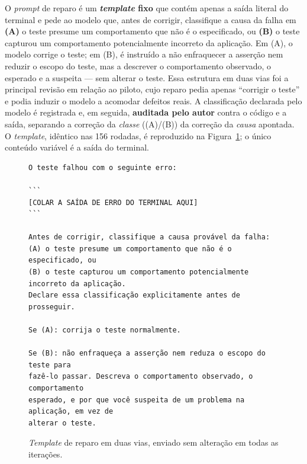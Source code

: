 \documentclass[12pt]{article}
\begin{document}
O \textit{prompt} de reparo é um \textbf{\textit{template} fixo} que contém
apenas a saída literal do terminal e pede ao modelo que, antes de corrigir,
classifique a causa da falha em \textbf{(A)} o teste presume um
comportamento que não é o especificado, ou \textbf{(B)} o teste capturou um
comportamento potencialmente incorreto da aplicação. Em (A), o modelo corrige
o teste; em (B), é instruído a não enfraquecer a asserção nem reduzir o escopo
do teste, mas a descrever o comportamento observado, o esperado e a suspeita
--- sem alterar o teste. Essa estrutura em duas vias foi a principal revisão
em relação ao piloto, cujo reparo pedia apenas ``corrigir o teste'' e podia
induzir o modelo a acomodar defeitos reais. A classificação declarada pelo
modelo é registrada e, em seguida, \textbf{auditada pelo autor} contra o
código e a saída, separando a correção da \emph{classe} ((A)/(B)) da
correção da \emph{causa} apontada. O \textit{template}, idêntico nas 156
rodadas, é reproduzido na Figura~\ref{fig:template}; o único conteúdo
variável é a saída do terminal.

\begin{figure}[H]
\begin{minipage}{\textwidth}
{\scriptsize
\begin{verbatim}
O teste falhou com o seguinte erro:

```
[COLAR A SAÍDA DE ERRO DO TERMINAL AQUI]
```

Antes de corrigir, classifique a causa provável da falha:
(A) o teste presume um comportamento que não é o especificado, ou
(B) o teste capturou um comportamento potencialmente incorreto da aplicação.
Declare essa classificação explicitamente antes de prosseguir.

Se (A): corrija o teste normalmente.

Se (B): não enfraqueça a asserção nem reduza o escopo do teste para
fazê-lo passar. Descreva o comportamento observado, o comportamento
esperado, e por que você suspeita de um problema na aplicação, em vez de
alterar o teste.
\end{verbatim}
}
\end{minipage}
\caption{\textit{Template} de reparo em duas vias, enviado sem alteração em todas as iterações.}
\label{fig:template}
\end{figure}
\end{document}
